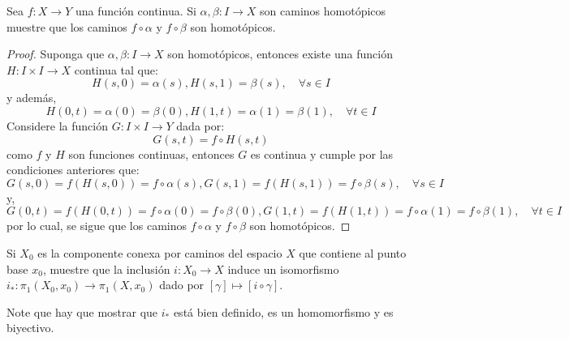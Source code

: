 \documentclass[12pt]{report}
\theoremstyle{largebreak}
\newcommand\cf[3]{\ensuremath{#1:#2\rightarrow#3}}
\begin{document}
    \begin{excer}
        Sea $\cf{f}{X}{Y}$ una función continua. Si $\cf{\alpha,\beta}{I}{X}$ son caminos homotópicos muestre que los caminos $f\circ\alpha$ y $f\circ\beta$ son homotópicos.
    \end{excer}

    \begin{proof}
        Suponga que $\cf{\alpha,\beta}{I}{X}$ son homotópicos, entonces existe una función $\cf{H}{I\times I}{X}$ continua tal que:
        \begin{equation*}
            H(s,0)=\alpha(s),H(s,1)=\beta(s),\quad\forall s\in I
        \end{equation*}
        y además,
        \begin{equation*}
            H(0,t)=\alpha(0)=\beta(0),H(1,t)=\alpha(1)=\beta(1),\quad\forall t\in I
        \end{equation*}
        Considere la función $\cf{G}{I\times I}{Y}$ dada por:
        \begin{equation*}
            G(s,t)=f\circ H(s,t)
        \end{equation*}
        como $f$ y $H$ son funciones continuas, entonces $G$ es continua y cumple por las condiciones anteriores que:
        \begin{equation*}
            G(s,0)=f(H(s,0))=f\circ\alpha(s),G(s,1)=f(H(s,1))=f\circ\beta(s),\quad\forall s\in I
        \end{equation*}
        y,
        \begin{equation*}
            G(0,t)=f(H(0,t))=f\circ\alpha(0)=f\circ\beta(0),G(1,t)=f(H(1,t))=f\circ\alpha(1)=f\circ\beta(1),\quad\forall t\in I
        \end{equation*}
        por lo cual, se sigue que los caminos $f\circ\alpha$ y $f\circ\beta$ son homotópicos.
    \end{proof}

    \begin{excer}
        Si $X_0$ es la componente conexa por caminos del espacio $X$ que contiene al punto base $x_0$, muestre que la inclusión $\cf{i}{X_0}{X}$ induce un isomorfismo $\cf{i_*}{\pi_1(X_0,x_0)}{\pi_1(X,x_0)}$ dado por $[\gamma]\mapsto[i\circ\gamma]$.

        Note que hay que mostrar que $i_*$ está bien definido, es un homomorfismo y es biyectivo.
    \end{excer}
\end{document}

